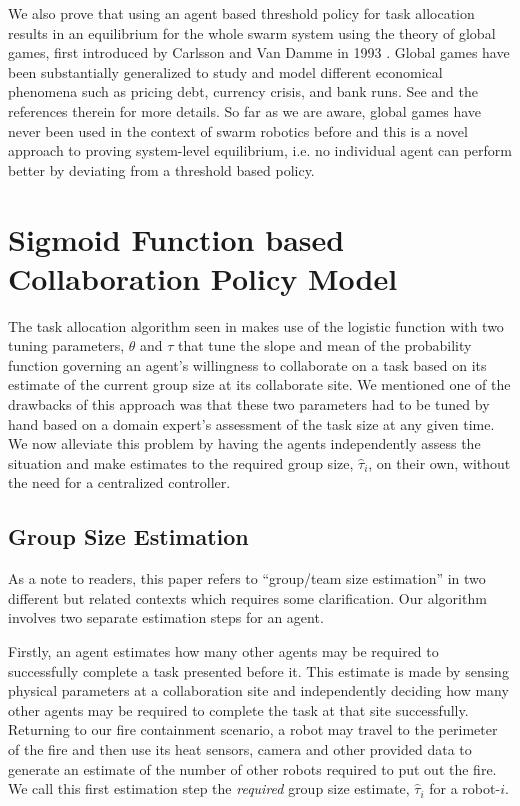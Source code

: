 \documentclass[conference]{ieeeconf}
\def\estt{\hat{\tau}}
\begin{document}
We also prove that using an agent based threshold policy for task allocation results in an equilibrium for the whole swarm system using the theory of global games, first introduced by Carlsson and Van Damme in 1993 \cite{Carlsson1993}. Global games have been substantially generalized to study and model different economical phenomena such as pricing debt, currency crisis, and bank runs. See \cite{Morris2000} and the references therein for more details. So far as we are aware, global games have never been used in the context of swarm robotics before and this is a novel approach to proving system-level equilibrium, i.e. no individual agent can perform better by deviating from a threshold based policy.

\section{Sigmoid Function based Collaboration Policy Model}\label{sec:model}
The task allocation algorithm seen in \cite{Kanakia2014} makes use of the logistic function with two tuning parameters, $\theta$ and $\tau$ that tune the slope and mean of the probability function governing an agent's willingness to collaborate on a task based on its estimate of the current group size at its collaborate site. We mentioned one of the drawbacks of this approach was that these two parameters had to be tuned by hand based on a domain expert's assessment of the task size at any given time. We now alleviate this problem by having the agents independently assess the situation and make estimates to the required group size, $\estt_i$, on their own, without the need for a centralized controller.

\subsection{Group Size Estimation}\label{sec:gpsizeest}
As a note to readers, this paper refers to ``group/team size estimation'' in two different but related contexts which requires some clarification. Our algorithm involves two separate estimation steps for an agent. 

Firstly, an agent estimates how many other agents may be required to successfully complete a task presented before it. This estimate is made by sensing physical parameters at a collaboration site and independently deciding how many other agents may be required to complete the task at that site successfully. Returning to our fire containment scenario, a robot may travel to the perimeter of the fire and then use its heat sensors, camera and other provided data to generate an estimate of the number of other robots required to put out the fire. We call this first estimation step the \emph{required} group size estimate, $\estt_i$ for a robot-$i$.
\end{document}
